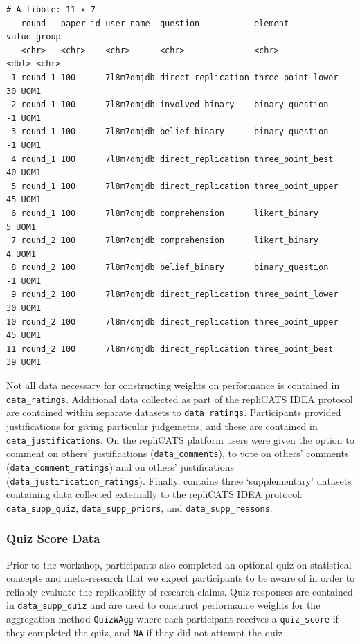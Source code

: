 \documentclass[article]{jss}
\begin{document}
\begin{verbatim}
# A tibble: 11 x 7
   round   paper_id user_name  question           element           value group
   <chr>   <chr>    <chr>      <chr>              <chr>             <dbl> <chr>
 1 round_1 100      7l8m7dmjdb direct_replication three_point_lower    30 UOM1 
 2 round_1 100      7l8m7dmjdb involved_binary    binary_question      -1 UOM1 
 3 round_1 100      7l8m7dmjdb belief_binary      binary_question      -1 UOM1 
 4 round_1 100      7l8m7dmjdb direct_replication three_point_best     40 UOM1 
 5 round_1 100      7l8m7dmjdb direct_replication three_point_upper    45 UOM1 
 6 round_1 100      7l8m7dmjdb comprehension      likert_binary         5 UOM1 
 7 round_2 100      7l8m7dmjdb comprehension      likert_binary         4 UOM1 
 8 round_2 100      7l8m7dmjdb belief_binary      binary_question      -1 UOM1 
 9 round_2 100      7l8m7dmjdb direct_replication three_point_lower    30 UOM1 
10 round_2 100      7l8m7dmjdb direct_replication three_point_upper    45 UOM1 
11 round_2 100      7l8m7dmjdb direct_replication three_point_best     39 UOM1 
\end{verbatim}

Not all data necessary for constructing weights on performance is
contained in \texttt{data\_ratings}. Additional data collected as part
of the repliCATS IDEA protocol are contained within separate datasets to
\texttt{data\_ratings}. Participants provided justifications for giving
particular judgemetns, and these are contained in
\texttt{data\_justifications}. On the repliCATS platform users were
given the option to comment on others' justifications
(\texttt{data\_comments}), to vote on others' comments
(\texttt{data\_comment\_ratings}) and on others' justifications
(\texttt{data\_justification\_ratings}). Finally, 
contains three `supplementary' datasets containing data collected
externally to the repliCATS IDEA protocol: \texttt{data\_supp\_quiz},
\texttt{data\_supp\_priors}, and \texttt{data\_supp\_reasons}.

\hypertarget{sec-quiz-supplementary-data}{%
\subsubsection{Quiz Score Data}\label{sec-quiz-supplementary-data}}

Prior to the workshop, participants also completed an optional quiz on
statistical concepts and meta-research that we expect participants to be
aware of in order to reliably evaluate the replicability of research
claims. Quiz responses are contained in \texttt{data\_supp\_quiz} and
are used to construct performance weights for the aggregation method
\texttt{QuizWAgg} where each participant receives a \texttt{quiz\_score}
if they completed the quiz, and \texttt{NA} if they did not attempt the
quiz \citep[see][ for further details]{Hanea2021}.
\end{document}
